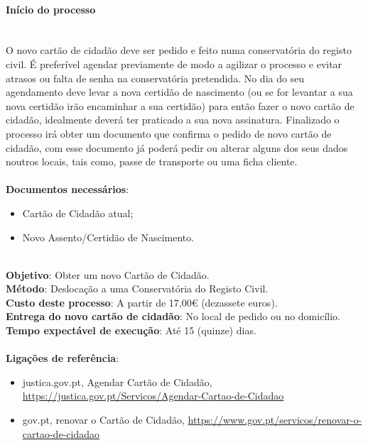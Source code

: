 \paragraph{Início do processo}
\leavevmode\\
O novo cartão de cidadão deve ser pedido e feito numa conservatória do
registo civil. É preferível agendar previamente de modo a agilizar o
processo e evitar atrasos ou falta de senha na conservatória pretendida.
No dia do seu agendamento deve levar a nova certidão de nascimento (ou
se for levantar a sua nova certidão irão encaminhar a sua certidão) para
então fazer o novo cartão de cidadão, idealmente deverá ter praticado a
sua nova assinatura. Finalizado o processo irá obter um documento que
confirma o pedido de novo cartão de cidadão, com esse documento já
poderá pedir ou alterar alguns dos seus dados noutros locais, tais como,
passe de transporte ou uma ficha cliente. \\
\\
\textbf{Documentos necessários}:
\begin{itemize}
	\item Cartão de Cidadão atual;
	\item Novo Assento/Certidão de Nascimento.
\end{itemize}
\leavevmode\\
\textbf{Objetivo}: Obter um novo Cartão de Cidadão. \\
\textbf{Método}: Deslocação a uma Conservatória do Registo Civil. \\
\textbf{Custo deste	processo}: A partir de 17,00€ (dezassete euros). \\
\textbf{Entrega do novo	cartão de cidadão}: No local de pedido ou no domicílio. \\
\textbf{Tempo expectável de execução}: Até 15 (quinze) dias. \\
\\
\textbf{Ligações de referência}:
\begin{itemize}
	\item justica.gov.pt, Agendar Cartão de Cidadão, \url{https://justica.gov.pt/Servicos/Agendar-Cartao-de-Cidadao}
	\item gov.pt, renovar o Cartão de Cidadão, \url{https://www.gov.pt/servicos/renovar-o-cartao-de-cidadao}
\end{itemize}

